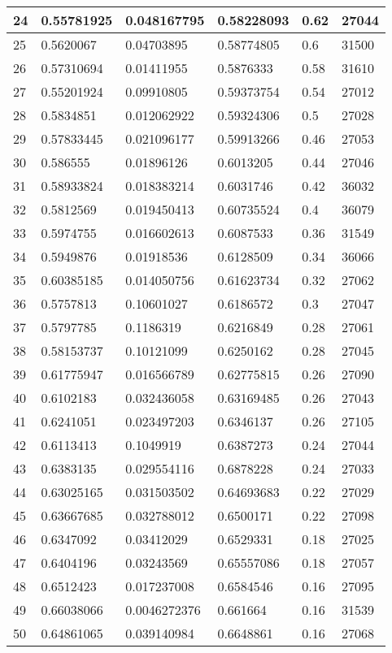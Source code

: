 \begin{longtable}{|l|l|l|l|l|l|}
24 & 0.55781925 & 0.048167795 & 0.58228093 & 0.62 & 27044 \\ \hline 
25 & 0.5620067 & 0.04703895 & 0.58774805 & 0.6 & 31500 \\ \hline 
26 & 0.57310694 & 0.01411955 & 0.5876333 & 0.58 & 31610 \\ \hline 
27 & 0.55201924 & 0.09910805 & 0.59373754 & 0.54 & 27012 \\ \hline 
28 & 0.5834851 & 0.012062922 & 0.59324306 & 0.5 & 27028 \\ \hline 
29 & 0.57833445 & 0.021096177 & 0.59913266 & 0.46 & 27053 \\ \hline 
30 & 0.586555 & 0.01896126 & 0.6013205 & 0.44 & 27046 \\ \hline 
31 & 0.58933824 & 0.018383214 & 0.6031746 & 0.42 & 36032 \\ \hline 
32 & 0.5812569 & 0.019450413 & 0.60735524 & 0.4 & 36079 \\ \hline 
33 & 0.5974755 & 0.016602613 & 0.6087533 & 0.36 & 31549 \\ \hline 
34 & 0.5949876 & 0.01918536 & 0.6128509 & 0.34 & 36066 \\ \hline 
35 & 0.60385185 & 0.014050756 & 0.61623734 & 0.32 & 27062 \\ \hline 
36 & 0.5757813 & 0.10601027 & 0.6186572 & 0.3 & 27047 \\ \hline 
37 & 0.5797785 & 0.1186319 & 0.6216849 & 0.28 & 27061 \\ \hline 
38 & 0.58153737 & 0.10121099 & 0.6250162 & 0.28 & 27045 \\ \hline 
39 & 0.61775947 & 0.016566789 & 0.62775815 & 0.26 & 27090 \\ \hline 
40 & 0.6102183 & 0.032436058 & 0.63169485 & 0.26 & 27043 \\ \hline 
41 & 0.6241051 & 0.023497203 & 0.6346137 & 0.26 & 27105 \\ \hline 
42 & 0.6113413 & 0.1049919 & 0.6387273 & 0.24 & 27044 \\ \hline 
43 & 0.6383135 & 0.029554116 & 0.6878228 & 0.24 & 27033 \\ \hline 
44 & 0.63025165 & 0.031503502 & 0.64693683 & 0.22 & 27029 \\ \hline 
45 & 0.63667685 & 0.032788012 & 0.6500171 & 0.22 & 27098 \\ \hline 
46 & 0.6347092 & 0.03412029 & 0.6529331 & 0.18 & 27025 \\ \hline 
47 & 0.6404196 & 0.03243569 & 0.65557086 & 0.18 & 27057 \\ \hline 
48 & 0.6512423 & 0.017237008 & 0.6584546 & 0.16 & 27095 \\ \hline 
49 & 0.66038066 & 0.0046272376 & 0.661664 & 0.16 & 31539 \\ \hline 
50 & 0.64861065 & 0.039140984 & 0.6648861 & 0.16 & 27068 \\ \hline 
\end{longtable}